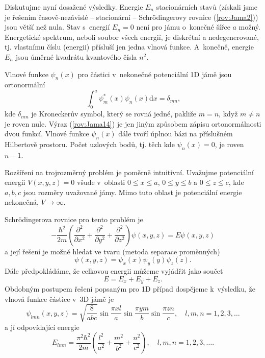 Diskutujme nyní dosažené výsledky. Energie $E_n$ stacionárních stavů (získali jsme je řešením časově-nezávislé -- stacionární -- Schrödingerovy rovnice (\ref{rov:Jama2})) jsou větší než nula. Stav s~energií $E_n=0$ není pro jámu o~konečné šířce $a$ možný. Energetické spektrum, neboli soubor všech energií, je diskrétní a nedegenerované, tj. vlastnímu číslu (energii) přísluší jen jedna vlnová funkce. A~konečně, energie $E_n$ jsou úměrné kvadrátu kvantového čísla $n^2$.

Vlnové funkce $\psi_n(x)$ pro částici v~nekonečné potenciální 1D jámě jsou ortonormální
\begin{equation}
\int_0^a \psi_m^\ast(x) \psi_n(x) \mathrm{d}x = \delta_{mn} \mbox{,}
\label{rov:Jama14}
\end{equation}
kde $\delta_{mn}$ je Kroneckerův symbol, který se rovná jedné, pakliže $m=n$, když $m \not = n$ je roven nule. Výraz (\ref{rov:Jama14}) je jen jiným způsobem zápisu ortonormálnosti dvou funkcí. Vlnové funkce $\psi_n(x)$ dále tvoří úplnou bázi na příslušném Hilbertově prostoru. Počet uzlových bodů, tj. těch kde $\psi_n(x)=0$, je roven $n-1$.

Rozšíření na trojrozměrný problém je poměrně intuitivní. Uvažujme potenciální energii $V(x,y,z) = 0$ všude v~oblasti $0\leq x\leq a$, $0\leq y \leq b$ a $0\leq z \leq c$, kde $a, b, c$ jsou rozměry uvažované jámy. Mimo tuto oblast je potenciální energie nekonečná, $V \rightarrow \infty$.

Schrödingerova rovnice pro tento problém je
\begin{equation}
-\frac{\hbar^2}{2m} \left(\frac{\partial^2}{\partial x^2} + \frac{\partial^2}{\partial y^2} + \frac{\partial^2}{\partial z^2} \right) \psi(x,y,z) = E \psi(x,y,z)
\label{rov:Jama15}
\end{equation}
a její řešení je možné hledat ve tvaru (metoda separace proměnných) 
\begin{equation}
\psi(x,y,z) = \psi_x(x)\psi_y(y)\psi_z(z) \mbox{.}
\label{rov:Jama16}
\end{equation}
Dále předpokládáme, že celkovou energii můžeme vyjádřit jako součet
\begin{equation}
E = E_x + E_y + E_z \mbox{.}
\label{rov:Jama17}
\end{equation}
Obdobným postupem řešení popsaným pro 1D případ dospějeme k~výsledku, že vlnová funkce částice v~3D jámě je
\begin{equation}
\psi_{lmn}(x,y,z) = \sqrt{\frac{8}{abc}} \sin \frac{\pi xl}{a}\sin \frac{\pi ym}{b} \sin \frac{\pi zn}{c}, \quad l,m,n = 1,2,3, \dots
\label{rov:Jama18}
\end{equation}
a jí odpovídající energie
\begin{equation}
E_{lmn} = \frac{\pi^2\hbar^2}{2m} \left(\frac{l^2}{a^2} + \frac{m^2}{b^2} + \frac{n^2}{c^2} \right), \quad l,m,n = 1,2,3, \dots \mbox{.}
\label{rov:Jama19} 
\end{equation}

